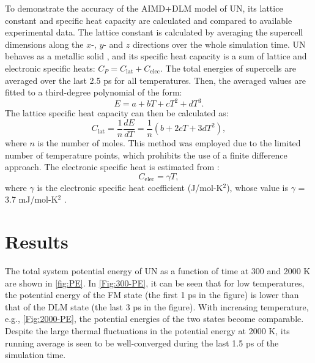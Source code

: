\documentclass[preprint, 12pt]{elsarticle}
\newcommand{\?}{\stackrel{?}{=}}
\begin{document}
To demonstrate the accuracy of the AIMD+DLM model of UN, its lattice constant and specific heat capacity are calculated and compared to available experimental data. The lattice constant is calculated by averaging the supercell dimensions along the $x$-, $y$- and $z$ directions over the whole simulation time. UN behaves as a metallic solid \cite{Yang2021}, and its specific heat capacity is a sum of lattice and electronic specific heats: $C_P = C_\mathrm{lat} + C_\mathrm{elec}$. The total energies of supercells are averaged over the last 2.5 ps for all temperatures. Then, the averaged values are fitted to a third-degree polynomial of the form:
\begin{equation}
E = a + b T + c T^2 + d T^3.
\end{equation}
The lattice specific heat capacity can then be calculated as:
\begin{equation}
C_\mathrm{lat} = \frac{1}{n} \frac{dE}{dT} = \frac{1}{n} \left( b + 2 c T + 3 d T^2 \right),
\end{equation}
where $n$ is the number of moles. This method was employed due to the limited number of temperature points, which prohibits the use of a finite difference approach. The electronic specific heat is estimated from \cite{Gopal1966}:
\begin{equation}
C_\mathrm{elec} = \gamma T,
\end{equation}
where $\gamma$ is the electronic specific heat coefficient (J/mol-K$^2$), whose value is $\gamma$ = 3.7 mJ/mol-K$^2$ \cite{Samsel2007,AbdulHameed2024}.

\section{Results}

The total system potential energy of UN as a function of time at 300 and 2000 K are shown in \cref{fig:PE}. In \cref{Fig:300-PE}, it can be seen that for low temperatures, the potential energy of the FM state (the first 1 ps in the figure) is lower than that of the DLM state (the last 3 ps in the figure). With increasing temperature, e.g., \cref{Fig:2000-PE}, the potential energies of the two states become comparable. Despite the large thermal fluctuations in the potential energy at 2000 K, its running average is seen to be well-converged during the last 1.5 ps of the simulation time.
\end{document}
